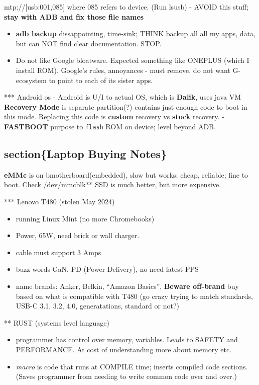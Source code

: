 \documentclass[
]{report}
\providecommand{\tightlist}{%
  \setlength{\itemsep}{0pt}\setlength{\parskip}{0pt}}\usepackage{longtable,booktabs,array}
\begin{document}
mtp://{[}usb:001,085{]} where 085 refers to device. (Run lsusb) - AVOID
this stuff; \textbf{stay with ADB and fix those file names}

\begin{itemize}
\tightlist
\item
  \textbf{adb backup} dissappointing, time-sink; THINK backup all all my
  apps, data, but can NOT find clear documentation. STOP.
\item
  Do not like Google bloatware. Expected something like ONEPLUS (which I
  install ROM). Google's rules, annoyances - must remove. do not want G-
  ecosystem to point to each of its sister apps.
\end{itemize}

*** Android os - Android is U/I to actual OS, which is \textbf{Dalik},
uses java VM \textbf{Recovery Mode} is separate partition(?) contains
just enough code to boot in this mode. Replacing this code is
\textbf{custom} recovery vs \textbf{stock} recovery. - \textbf{FASTBOOT}
purpose to \texttt{flash} ROM on device; level beyond ADB.

\subsection{section\{Laptop Buying
Notes\}}\label{sectionlaptop-buying-notes}

\textbf{eMMc} is on bmotherboard(embedded), slow but works: cheap,
reliable; fine to boot. Check /dev/mmcblk** SSD is much better, but more
expensive.

*** Lenovo T480 (stolen May 2024)

\begin{itemize}
\tightlist
\item
  running Linux Mint (no more Chromebooks)
\item
  Power, 65W, need brick or wall charger.
\item
  cable must support 3 Amps
\item
  buzz words GaN, PD (Power Delivery), no need latest PPS
\item
  name brands: Anker, Belkin, ``Amazon Basics'', \textbf{Beware
  off-brand} buy based on what is compatible with T480 (go crazy trying
  to match standards, USB-C 3.1, 3.2, 4.0, generatations, standard or
  not?)
\end{itemize}

** RUST (systems level language)

\begin{itemize}
\item
  programmer has control over memory, variables. Leads to SAFETY and
  PERFORMANCE. At cost of understanding more about memory etc.
\item
  \emph{macro} is code that runs at COMPILE time; inserts compiled code
  sections. (Saves programmer from needing to write common code over and
  over.)
\end{itemize}
\end{document}
